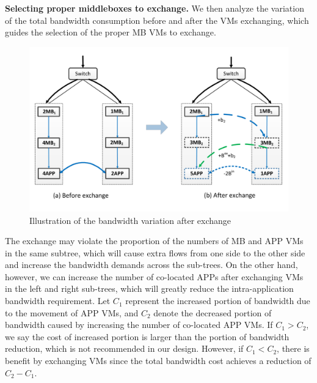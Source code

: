 \documentclass[review]{elsarticle}
\begin{document}
\textbf{Selecting proper middleboxes to exchange.} 
We then analyze the variation of the total bandwidth consumption before and after the VMs exchanging, which guides the selection of the proper MB VMs to exchange. 
\begin{figure}
	\centering
	\includegraphics[width=4.5in]{fig/exchange_example.pdf}
	\caption{Illustration of the bandwidth variation after exchange}
    \label{fig:exchange}
\end{figure}
The exchange may violate the proportion of the numbers of MB and APP VMs in the same subtree, which will cause extra flows from one side to the other side and increase the bandwidth demands across the sub-trees. On the other hand, however, we can increase the number of co-located APPs after exchanging VMs in the left and right sub-trees, which will greatly reduce the intra-application bandwidth requirement. Let $C_1$ represent the increased portion of bandwidth due to the movement of APP VMs, 
and $C_2$ denote the decreased portion of bandwidth caused by increasing the number of co-located APP VMs. If $C_1>C_2$, we say the cost of increased portion is larger than the portion of bandwidth reduction, 
which is not recommended in our design. 
However, if $C_1<C_2$, there is benefit by exchanging VMs since the total bandwidth cost achieves 
a reduction of $C_2-C_1$. 
\end{document}
